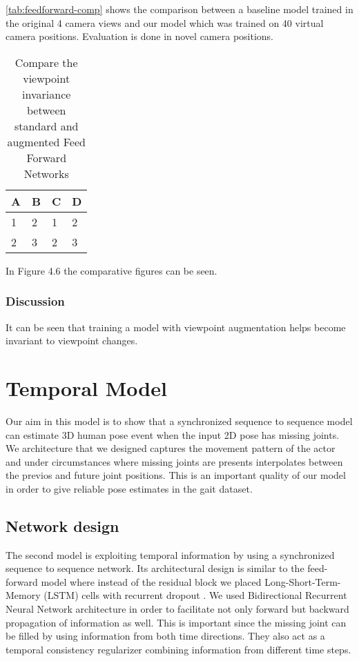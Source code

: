 \autoref{tab:feedforward-comp} shows the comparison between a baseline model trained in the original 4 camera views and our model which was trained on 40 virtual camera positions. Evaluation is done in novel camera positions.

\begin{table}[htpb]
    \centering
    \begin{tabular}{l l l l}
        \toprule
            A & B & C & D \\
        \midrule
            1 & 2 & 1 & 2 \\
            2 & 3 & 2 & 3 \\
        \bottomrule
    \end{tabular}
    \caption[Comparison Feed Forward Network]{Compare the viewpoint invariance between standard and augmented Feed Forward Networks}\label{tab:feedforward-comp}
\end{table}



In Figure 4.6 the comparative figures can be seen. 

\subsubsection{Discussion}

It can be seen that training a model with viewpoint augmentation helps become invariant to viewpoint changes.


\section{Temporal Model}

Our aim in this model is to show that a synchronized sequence to sequence model can estimate 3D human pose event when the input 2D pose has missing joints. We architecture that we designed captures the movement pattern of the actor and under circumstances where missing joints are presents interpolates between the previos and future joint positions. This is an important quality of our model in order to give reliable pose estimates in the gait dataset. 

\subsection{Network design}

The second model is exploiting temporal information by using a synchronized sequence to sequence network. Its architectural design is similar to the feed-forward model where instead of the residual block we placed Long-Short-Term-Memory (LSTM) \parencite{hochreiter1997long} cells with recurrent dropout \parencite{semeniuta2016recurrent}. We used Bidirectional Recurrent Neural Network \parencite{schuster1997bidirectional} architecture in order to facilitate not only forward but backward propagation of information as well. This is important since the missing joint can be filled by using 
information from both time directions. They also act as a temporal consistency regularizer combining information from different time steps.

